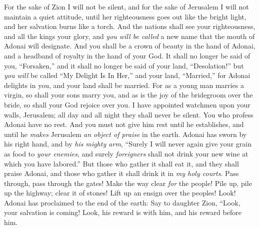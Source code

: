 \begin{biblechapter} %
 For the sake of Zion I will not be silent, 
and for the sake of Jerusalem I will not maintain a quiet attitude, 
until her righteousness goes out like the bright light, 
and her salvation burns like a torch.
\verse And the nations shall see your righteousness, 
and all the kings your glory, 
and \textit{you will be called} a new name 
that the mouth of Adonai will designate.
\verse And you shall be a crown of beauty in the hand of Adonai, 
and a headband of royalty in the hand of your God.
\verse It shall no longer be said of you, “Forsaken,” 
and it shall no longer be said of your land, “Desolation!” 
but \textit{you will} be called “My Delight Is In Her,” 
and your land, “Married,” 
for Adonai delights in you, 
and your land shall be married.
\verse For as a young man marries a virgin, 
so shall your sons marry you, 
and as is the joy of the bridegroom over the bride, 
so shall your God rejoice over you.
\verse I have appointed watchmen upon your walls, Jerusalem; 
all day and all night they shall never be silent. 
You who profess Adonai have no rest.
\verse And you must not give him rest until he establishes, 
and until he \textit{makes} Jerusalem \textit{an object of praise} in the earth.
\verse Adonai has sworn by his right hand, 
and by \textit{his mighty arm}, 
“Surely I will never again give your grain as food to \textit{your enemies}, 
and surely \textit{foreigners} shall not drink your new wine at which you have labored.”
\verse But those who gather it shall eat it, and they shall praise Adonai, 
and those who gather it shall drink it in \textit{my holy courts}.
\verse Pass through, pass through the gates! 
Make the way clear \textit{for} the people! 
Pile up, pile up the highway; clear it of stones! 
Lift up an ensign over the peoples!
\verse Look! Adonai has proclaimed to the end of the earth:
\verse Say to daughter Zion, “Look, your salvation is coming! 
Look, his reward is with him, 
and his reward before him.
\end{biblechapter}

